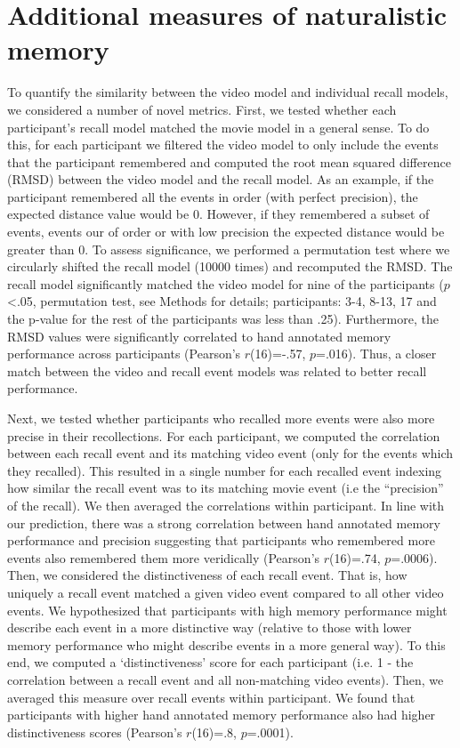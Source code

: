 \documentclass{article}
\begin{document}
{\section{Additional measures of naturalistic memory}
To quantify the similarity between the video model and individual recall models, we considered a number of novel metrics.  First, we tested whether each participant's recall model matched the movie model in a general sense. To do this, for each participant we filtered the video model to only include the events that the participant remembered and computed the root mean squared difference (RMSD) between the video model and the recall model. As an example, if the participant remembered all the events in order (with perfect precision), the expected distance value would be 0. However, if they remembered a subset of events, events our of order or with low precision the expected distance would be greater than 0. To assess significance, we performed a permutation test where we circularly shifted the recall model (10000 times) and recomputed the RMSD. The recall model significantly matched the video model for nine of the participants ($p$<.05, permutation test, see Methods for details; participants: 3-4, 8-13, 17 and the p-value for the rest of the participants was less than .25). Furthermore, the RMSD values were significantly correlated to hand annotated memory performance across participants (Pearson's $r$(16)=-.57, $p$=.016). Thus, a closer match between the video and recall event models was related to better recall performance.

Next, we tested whether participants who recalled more events were also more precise in their recollections. For each participant, we computed the correlation between each recall event and its matching video event (only for the events which they recalled). This resulted in a single number for each recalled event indexing how similar the recall event was to its matching movie event (i.e the ``precision'' of the recall). We then averaged the correlations within participant. In line with our prediction, there was a strong correlation between hand annotated memory performance and precision suggesting that participants who remembered more events also remembered them more veridically (Pearson's $r$(16)=.74, $p$=.0006). Then, we considered the distinctiveness of each recall event. That is, how uniquely a recall event matched a given video event compared to all other video events. We hypothesized that participants with high memory performance might describe each event in a more distinctive way (relative to those with lower memory performance who might describe events in a more general way). To this end, we computed a `distinctiveness' score for each participant (i.e. 1 - the correlation between a recall event and all non-matching video events).  Then, we averaged this measure over recall events within participant.  We found that participants with higher hand annotated memory performance also had higher distinctiveness scores (Pearson's $r$(16)=.8, $p$=.0001).

}
\end{document}
